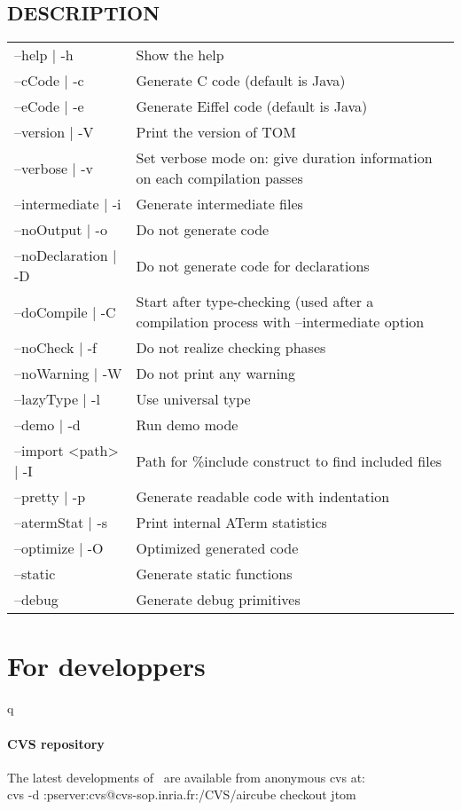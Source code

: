 \subsection{DESCRIPTION}
\begin{tabular}{|l|l|}
\hline
--help | -h&            Show the help \\
--cCode | -c&           Generate C code (default is Java)\\
--eCode | -e&           Generate Eiffel code (default is Java)\\
--version | -V&         Print the version of TOM\\
--verbose | -v&         Set verbose mode on: give duration information
on each compilation passes\\
--intermediate | -i&    Generate intermediate files \\
--noOutput | -o&        Do not generate code \\
--noDeclaration | -D&   Do not generate code for declarations \\
--doCompile | -C&       Start after type-checking (used after a
compilation process with --intermediate option\\
--noCheck | -f&         Do not realize checking phases \\
--noWarning | -W&       Do not print any warning \\
--lazyType | -l&        Use universal type \\
--demo | -d&            Run demo mode \\
--import <path> | -I&   Path for \%include construct to find included files\\
--pretty | -p&          Generate readable code with indentation \\
--atermStat | -s&       Print internal ATerm statistics \\
--optimize | -O&        Optimized generated code \\
--static&               Generate static functions \\
--debug&                Generate debug primitives \\
\hline
\end{tabular}


\section{For developpers}q
\paragraph{CVS repository}
The latest developments of \TOM\ are available from anonymous cvs at:
\\cvs -d :pserver:cvs@cvs-sop.inria.fr:/CVS/aircube checkout jtom
